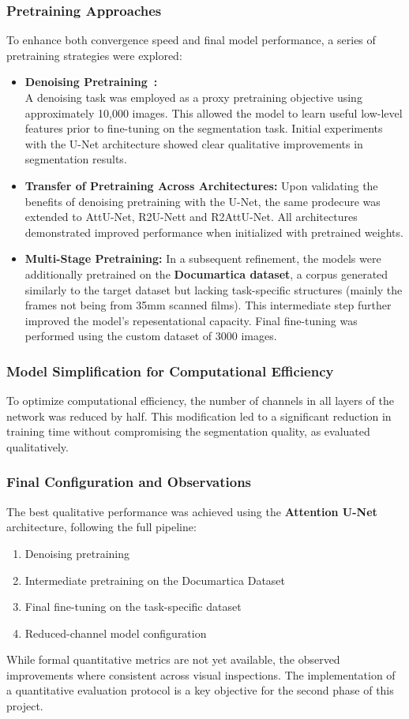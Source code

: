 \documentclass[openany, 12pt]{article}
\begin{document}
{	\subsubsection*{Pretraining Approaches}
	To enhance both convergence speed and final model performance, a series of pretraining strategies were explored:
	\begin{itemize}
		\item \textbf{Denoising Pretraining~\cite{9857234}:} \\
		A denoising task was employed as a proxy pretraining objective using approximately 10,000 images. This allowed the model to learn useful low-level features prior to fine-tuning on the segmentation task. Initial experiments with the U-Net architecture showed clear qualitative improvements in segmentation results.
		\item \textbf{Transfer of Pretraining Across Architectures:}
		Upon validating the benefits of denoising pretraining with the U-Net, the same prodecure was extended to AttU-Net, R2U-Nett and R2AttU-Net. All architectures demonstrated improved performance when initialized with pretrained weights.
		\item \textbf{Multi-Stage Pretraining:}
		In a subsequent refinement, the models were additionally pretrained on the \textbf{Documartica dataset}, a corpus generated similarly to the target dataset but lacking task-specific structures (mainly the frames not being from 35mm scanned films). This intermediate step further improved the model's repesentational capacity. Final fine-tuning was performed using the custom dataset of 3000 images. 
	\end{itemize}
	\subsubsection*{Model Simplification for Computational Efficiency}
	To optimize computational efficiency, the number of channels in all layers of the network was reduced by half. This modification led to a significant reduction in training time without compromising the segmentation quality, as evaluated qualitatively.
	
	\subsubsection*{Final Configuration and Observations}
	The best qualitative performance was achieved using the \textbf{Attention U-Net} architecture, following the full pipeline:
	\begin{enumerate}
		\item Denoising pretraining
		\item Intermediate pretraining on the Documartica Dataset
		\item Final fine-tuning on the task-specific dataset
		\item Reduced-channel model configuration
	\end{enumerate}
	While formal quantitative metrics are not yet available, the observed improvements where consistent across visual inspections. The implementation of a quantitative evaluation protocol is a key objective for the second phase of this project.
}
\end{document}

